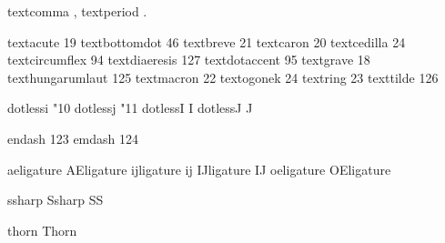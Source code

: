 

\startencoding[default]

 textcomma         ,
 textperiod        .

 textacute         19
 textbottomdot     46
 textbreve         21
 textcaron         20
 textcedilla       24
 textcircumflex    94
 textdiaeresis    127
 textdotaccent     95
 textgrave         18
 texthungarumlaut 125
 textmacron        22
 textogonek        24 %
 textring          23
 texttilde        126

 dotlessi         {\char"10 }
 dotlessj         {\char"11 }
 dotlessI         {I}
 dotlessJ         {J}

 endash           123
 emdash           124

 aeligature       { } %
 AEligature       { } %
 ijligature       {ij}
 IJligature       {IJ}
 oeligature       { } %
 OEligature       { } %

 ssharp           { } %
 Ssharp           {SS}

 thorn            {\unknownchar}
 Thorn            {\unknownchar}

